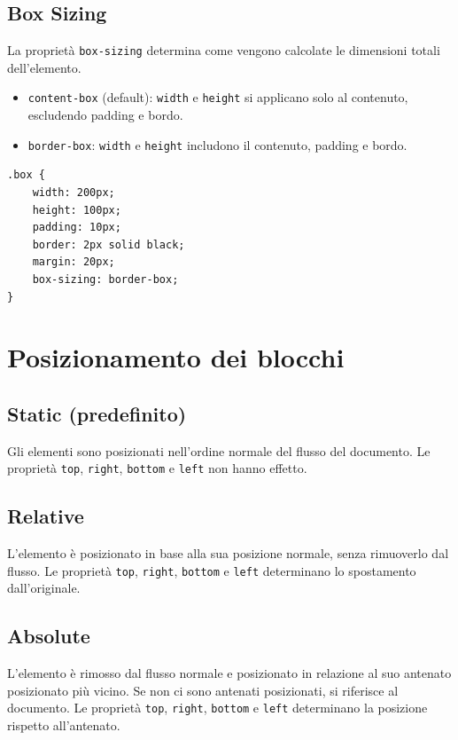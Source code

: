 \subsection{Box Sizing}

La proprietà \texttt{box-sizing} determina come vengono calcolate le dimensioni totali dell'elemento.

\begin{itemize}
    \item \texttt{content-box} (default): \texttt{width} e \texttt{height} si applicano solo al contenuto, escludendo padding e bordo.
    \item \texttt{border-box}: \texttt{width} e \texttt{height} includono il contenuto, padding e bordo.
\end{itemize}

\begin{lstlisting}[caption=Esempio di Box Model]
.box {
    width: 200px;
    height: 100px;
    padding: 10px;
    border: 2px solid black;
    margin: 20px;
    box-sizing: border-box;
}
\end{lstlisting}

\section{Posizionamento dei blocchi}

\subsection{Static (predefinito)}

Gli elementi sono posizionati nell'ordine normale del flusso del documento. Le proprietà \texttt{top}, \texttt{right}, \texttt{bottom} e \texttt{left} non hanno effetto.

\subsection{Relative}

L'elemento è posizionato in base alla sua posizione normale, senza rimuoverlo dal flusso. Le proprietà \texttt{top}, \texttt{right}, \texttt{bottom} e \texttt{left} determinano lo spostamento dall'originale.

\subsection{Absolute}

L'elemento è rimosso dal flusso normale e posizionato in relazione al suo antenato posizionato più vicino. Se non ci sono antenati posizionati, si riferisce al documento. Le proprietà \texttt{top}, \texttt{right}, \texttt{bottom} e \texttt{left} determinano la posizione rispetto all'antenato.

